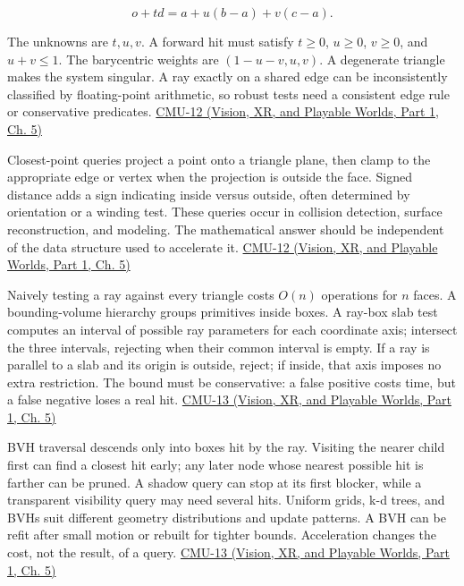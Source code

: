 \[
o+td=a+u(b-a)+v(c-a).
\]

The unknowns are \(t,u,v\). A forward hit must satisfy \(t\ge0\), \(u\ge0\), \(v\ge0\), and \(u+v\le1\). The barycentric weights are \((1-u-v,u,v)\). A degenerate triangle makes the system singular. A ray exactly on a shared edge can be inconsistently classified by floating-point arithmetic, so robust tests need a consistent edge rule or conservative predicates. \href{../07-Vision-XR-and-Playable-Worlds-P01/main.pdf\#nameddest=04-visual-computing-ii-ch036-cmu-12---geometric-queries}{CMU-12 (Vision, XR, and Playable Worlds, Part 1, Ch. 5)}

Closest-point queries project a point onto a triangle plane, then clamp to the appropriate edge or vertex when the projection is outside the face. Signed distance adds a sign indicating inside versus outside, often determined by orientation or a winding test. These queries occur in collision detection, surface reconstruction, and modeling. The mathematical answer should be independent of the data structure used to accelerate it. \href{../07-Vision-XR-and-Playable-Worlds-P01/main.pdf\#nameddest=04-visual-computing-ii-ch036-cmu-12---geometric-queries}{CMU-12 (Vision, XR, and Playable Worlds, Part 1, Ch. 5)}

Naively testing a ray against every triangle costs \(O(n)\) operations for \(n\) faces. A bounding-volume hierarchy groups primitives inside boxes. A ray-box slab test computes an interval of possible ray parameters for each coordinate axis; intersect the three intervals, rejecting when their common interval is empty. If a ray is parallel to a slab and its origin is outside, reject; if inside, that axis imposes no extra restriction. The bound must be conservative: a false positive costs time, but a false negative loses a real hit. \href{../07-Vision-XR-and-Playable-Worlds-P01/main.pdf\#nameddest=04-visual-computing-ii-ch036-cmu-13---spatial-data-structures}{CMU-13 (Vision, XR, and Playable Worlds, Part 1, Ch. 5)}

BVH traversal descends only into boxes hit by the ray. Visiting the nearer child first can find a closest hit early; any later node whose nearest possible hit is farther can be pruned. A shadow query can stop at its first blocker, while a transparent visibility query may need several hits. Uniform grids, k-d trees, and BVHs suit different geometry distributions and update patterns. A BVH can be refit after small motion or rebuilt for tighter bounds. Acceleration changes the cost, not the result, of a query. \href{../07-Vision-XR-and-Playable-Worlds-P01/main.pdf\#nameddest=04-visual-computing-ii-ch036-cmu-13---spatial-data-structures}{CMU-13 (Vision, XR, and Playable Worlds, Part 1, Ch. 5)}


